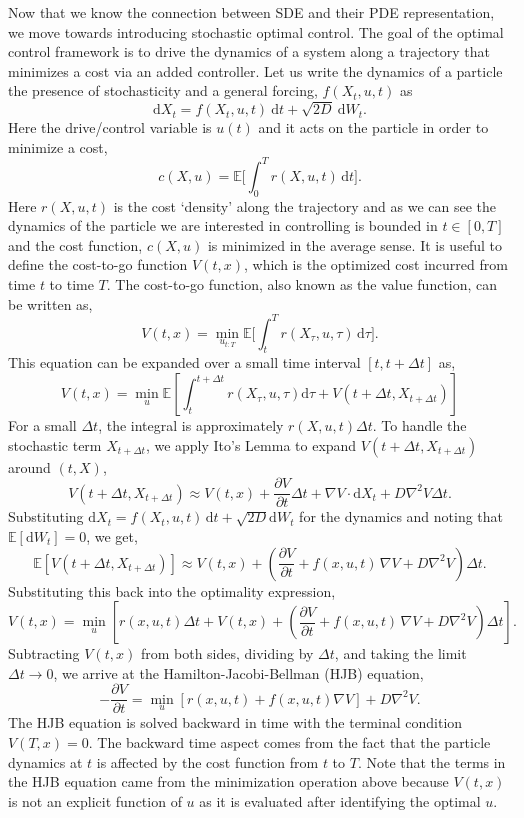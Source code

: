 \documentclass[12pt]{article}
\def\d{\mathrm{d}}
\def\E{\mathbb{E}}
\def\grad{\nabla}
\begin{document}
\begin{singlespace}
Now that we know the connection between SDE and their PDE representation, we move towards introducing stochastic optimal control. The goal of the optimal control framework is to drive the dynamics of a system along a trajectory that minimizes a cost via an added controller. Let us write the dynamics of a particle the presence of stochasticity and a general forcing, $f(X_t, u, t)$ as
\[
\d X_t = f(X_t, u, t) \ \d t + \sqrt{2D}\ \d W_t.
\]
Here the drive/control variable is $u(t)$ and it acts on the particle in order to minimize a cost,
\[
c(X, u) = \E \bigg[\int_0^T r(X, u, t)\,\d t \bigg].
\]
Here $r(X, u, t)$ is the cost `density' along the trajectory and as we can see the dynamics of the particle we are interested in controlling is bounded in $t \in [0, T]$ and the cost function, $c(X, u)$ is minimized in the average sense. It is useful to define the cost-to-go function $V(t, x)$, which is the optimized cost incurred from time $t$ to time $T$. The cost-to-go function, also known as the value function, can be written as,
\[
V(t, x) = \min_{u_{t:T}} \E \bigg[\int_t^T r(X_\tau, u, \tau)\,\d \tau \bigg].
\]
This equation can be expanded over a small time interval $[t, t+\Delta t]$ as,
\[
V(t, x) = \min_{u} \mathbb{E} \left[ \int_t^{t+\Delta t} r(X_\tau, u, \tau) \d \tau + V(t+\Delta t, X_{t+\Delta t}) \right]
\]
For a small $\Delta t$, the integral is approximately $r(X, u, t)\Delta t$. To handle the stochastic term $X_{t+\Delta t}$, we apply Ito's Lemma to expand $V(t+\Delta t, X_{t+\Delta t})$ around $(t, X)$,
\[
V(t+\Delta t, X_{t+\Delta t}) \approx V(t, x) + \frac{\partial V}{\partial t}\Delta t + \nabla V \cdot \d X_t + D \nabla^2 V \Delta t.
\]
Substituting $\d X_t = f(X_t, u, t)\,\d t + \sqrt{2D}\d W_t$ for the dynamics and noting that $\E[\d W_t] = 0$, we get,
\[
\mathbb{E}[V(t+\Delta t, X_{t+\Delta t})] \approx V(t, x) + \left( \frac{\partial V}{\partial t} + f(x, u, t) \, \grad V + D \grad^2 V \right) \Delta t.
\]
Substituting this back into the optimality expression,
\[
V(t, x) = \min_{u} \left[ r(x, u, t)\Delta t + V(t, x) + \left( \frac{\partial V}{\partial t} + f(x, u, t) \, \grad V + D \grad^2 V \right) \Delta t \right].
\]
Subtracting $V(t, x)$ from both sides, dividing by $\Delta t$, and taking the limit $\Delta t \to 0$, we arrive at the Hamilton-Jacobi-Bellman (HJB) equation,
\begin{equation}
-\frac{\partial V}{\partial t} = \min_{u} \left[ r(x, u, t) + f(x, u, t) \grad V \right] + D \grad^2 V.
\label{eq:HJB}
\end{equation}
The HJB equation is solved backward in time with the terminal condition $V(T, x) = 0$. The backward time aspect comes from the fact that the particle dynamics at $t$ is affected by the cost function from $t$ to $T$. Note that the terms in the HJB equation came from the minimization operation above because $V(t,x)$ is not an explicit function of $u$ as it is evaluated after identifying the optimal $u$.


\end{singlespace}
\end{document}
